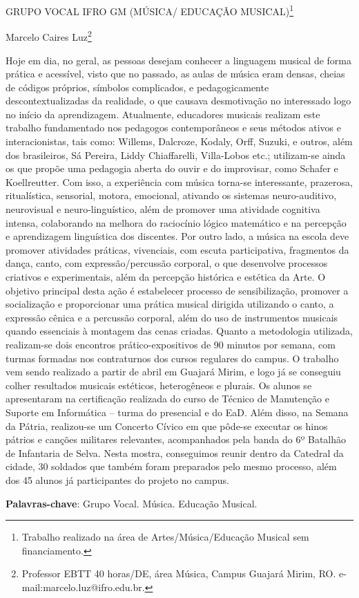 \documentclass[article,12pt,onesidea,4paper,english,brazil]{abntex2}
\begin{document}
	
	
	\frenchspacing 
	
	\begin{center}
		\LARGE GRUPO VOCAL IFRO GM (MÚSICA/ EDUCAÇÃO MUSICAL)\footnote{Trabalho realizado na área de Artes/Música/Educação Musical sem financiamento.}
		
		\normalsize
	Marcelo Caires Luz\footnote{Professor EBTT 40 horas/DE, área Música, Campus Guajará Mirim, RO. e-mail:marcelo.luz@ifro.edu.br.}  
	\end{center}
	
	\noindent Hoje em dia, no geral, as pessoas desejam conhecer a linguagem musical de forma
	prática e acessível, visto que no passado, as aulas de música eram densas, cheias
	de códigos próprios, símbolos complicados, e pedagogicamente
	descontextualizadas da realidade, o que causava desmotivação no interessado logo
	no início da aprendizagem. Atualmente, educadores musicais realizam este trabalho
	fundamentado nos pedagogos contemporâneos e seus métodos ativos e
	interacionistas, tais como: Willems, Dalcroze, Kodaly, Orff, Suzuki, e outros, além
	dos brasileiros, Sá Pereira, Liddy Chiaffarelli, Villa-Lobos etc.; utilizam-se ainda os
	que propõe uma pedagogia aberta do ouvir e do improvisar, como Schafer e
	Koellreutter. Com isso, a experiência com música torna-se interessante, prazerosa,
	ritualística, sensorial, motora, emocional, ativando os sistemas neuro-auditivo, neurovisual
	e neuro-linguístico, além de promover uma atividade cognitiva intensa,
	colaborando na melhora do raciocínio lógico matemático e na percepção e
	aprendizagem linguística dos discentes. Por outro lado, a música na escola deve
	promover atividades práticas, vivenciais, com escuta participativa, fragmentos da
	dança, canto, com expressão/percussão corporal, o que desenvolve processos
	criativos e experimentais, além da percepção histórica e estética da Arte. O objetivo
	principal desta ação é estabelecer processo de sensibilização, promover a
	socialização e proporcionar uma prática musical dirigida utilizando o canto, a
	expressão cênica e a percussão corporal, além do uso de instrumentos musicais
	quando essenciais à montagem das cenas criadas. Quanto a metodologia utilizada,
	realizam-se dois encontros prático-expositivos de 90 minutos por semana, com
	turmas formadas nos contraturnos dos cursos regulares do campus. O trabalho vem
	sendo realizado a partir de abril em Guajará Mirim, e logo já se conseguiu colher
	resultados musicais estéticos, heterogêneos e plurais. Os alunos se apresentaram
	na certificação realizada do curso de Técnico de Manutenção e Suporte em
	Informática – turma do presencial e do EaD. Além disso, na Semana da Pátria,
	realizou-se um Concerto Cívico em que pôde-se executar os hinos pátrios e canções
	militares relevantes, acompanhados pela banda do 6º Batalhão de Infantaria de
	Selva. Nesta mostra, conseguimos reunir dentro da Catedral da cidade, 30 soldados
	que também foram preparados pelo mesmo processo, além dos 45 alunos já
	participantes do projeto no campus.
	
	\vspace{\onelineskip}
	
	\noindent
	\textbf{Palavras-chave}: Grupo Vocal. Música. Educação Musical.
	
\end{document}
